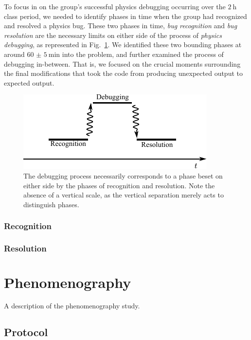 \documentclass{msuphddissertation}
\begin{document}
\begin{doublespace}
To focus in on the group's successful physics debugging occurring over the $\SI{2}{\hour}$ class period, we needed to identify phases in time when the group had recognized and resolved a physics bug.  These two phases in time, \emph{bug recognition} and \emph{bug resolution} are the necessary limits on either side of the process of \emph{physics debugging}, as represented in Fig.~\ref{CH4:Phases}.  We identified these two bounding phases at around $\SI{60(5)}{\minute}$ into the problem, and further examined the process of debugging in-between.  That is, we focused on the crucial moments surrounding the final modifications that took the code from producing unexpected output to expected output.

\begin{figure}\centering
\includegraphics[scale=1]{./images/phases.pdf}
\caption{The debugging process necessarily corresponds to a phase beset on either side by the phases of recognition and resolution.  Note the absence of a vertical scale, as the vertical separation merely acts to distinguish phases.}\label{CH4:Phases}
\end{figure}

\subsubsection{Recognition}

\subsubsection{Resolution}

\section{Phenomenography}\label{Sec:Phenom}

A description of the phenomenography study.

\subsection{Protocol}


\end{doublespace}
\end{document}
